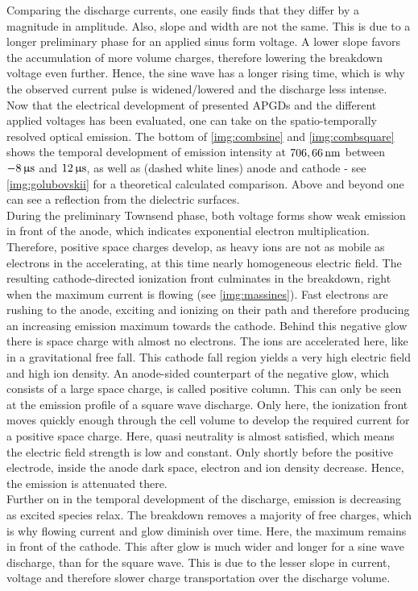\documentclass[a4paper,10pt,twoside]{article}
\begin{document}
		Comparing the discharge currents, one easily finds that they differ by a magnitude in amplitude. Also, slope and width are not the same. This is due to a longer preliminary phase for an applied sinus form voltage. A lower slope favors the accumulation of more volume charges, therefore lowering the breakdown voltage even further. Hence, the sine wave has a longer rising time, which is why the observed current pulse is widened/lowered and the discharge less intense.\\					
		Now that the electrical development of presented APGDs and the different applied voltages has been evaluated, one can take on the spatio-temporally resolved optical emission. The bottom of \autoref{img:combsine} and \autoref{img:combsquare} shows the temporal development of emission intensity at $\unit[706,66]{nm}$ between $\unit[-8]{\upmu s}$ and $\unit[12]{\upmu s}$, as well as (dashed white lines) anode and cathode - see \autoref{img:golubovskii} for a theoretical calculated comparison. Above and beyond one can see a reflection from the dielectric surfaces.\\
		During the preliminary Townsend phase, both voltage forms show weak emission in front of the anode, which indicates exponential electron multiplication. Therefore, positive space charges develop, as heavy ions are not as mobile as electrons in the accelerating, at this time nearly homogeneous electric field. The resulting cathode-directed ionization front culminates in the breakdown, right when the maximum current is flowing (see \autoref{img:massines}). Fast electrons are rushing to the anode, exciting and ionizing on their path and therefore producing an increasing emission maximum towards the cathode. Behind this negative glow there is space charge with almost no electrons. The ions are accelerated here, like in a gravitational free fall. This cathode fall region yields a very high electric field and high ion density. An anode-sided counterpart of the negative glow, which consists of a large space charge, is called positive column. This can only be seen at the emission profile of a square wave discharge. Only here, the ionization front moves quickly enough through the cell volume to develop the required current for a positive space charge.	Here, quasi neutrality is almost satisfied, which means the electric field strength is low and constant. Only shortly before the positive electrode, inside the anode dark space, electron and ion density decrease. Hence, the emission is attenuated there.\\
		Further on in the temporal development of the discharge, emission is decreasing as excited species relax. The breakdown removes a majority of free charges, which is why flowing current and glow diminish over time. Here, the maximum remains in front of the cathode. This after glow is much wider and longer for a sine wave discharge, than for the square wave. This is due to the lesser slope in current, voltage and therefore slower charge transportation over the discharge volume.\\
\end{document}
